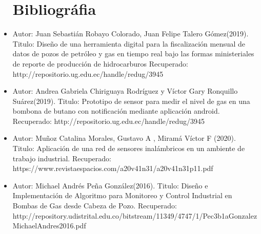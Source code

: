\documentclass[twoside,twocolumn]{article}
\begin{document}
\begin{itemize}
\section{Bibliográfia}
\item Autor: Juan Sebastián Robayo Colorado, Juan Felipe Talero Gómez(2019).
\newline
\newline
Titulo: Diseño de una herramienta digital para la fiscalización mensual de datos de pozos de petróleo y gas en tiempo real bajo las formas ministeriales de reporte de producción de hidrocarburos
\newline
\newline
Recuperado: http://repositorio.ug.edu.ec/handle/redug/3945
\newline
\newline

\item Autor: Andrea Gabriela Chiriguaya Rodríguez y Víctor Gary Ronquillo Suárez(2019).
\newline
\newline
Titulo: Prototipo de sensor para medir el nivel de gas en una bombona de butano con notificación mediante aplicación android.
\newline
\newline
Recuperado: http://repositorio.ug.edu.ec/handle/redug/3945
\newline
\newline

\item Autor: Muñoz Catalina Morales, Gustavo A , Miramá Víctor F (2020).
\newline
\newline
Titulo: Aplicación de una red de sensores inalámbricos en un ambiente de trabajo industrial.
\newline
\newline
Recuperado: https://www.revistaespacios.com/a20v41n31/a20v41n31p11.pdf
\newline
\newline

\item Autor: Michael Andrés Peña González(2016).
\newline
\newline
Titulo: Diseño e Implementación de Algoritmo para Monitoreo y Control Industrial en Bombas de Gas desde Cabeza de Pozo.
\newline
\newline
Recuperado: http://repository.udistrital.edu.co/bitstream/11349/4747/1/Pec3b1aGonzalezMichaelAndres2016.pdf
\newline
\newline

\end{itemize}
\end{document}
